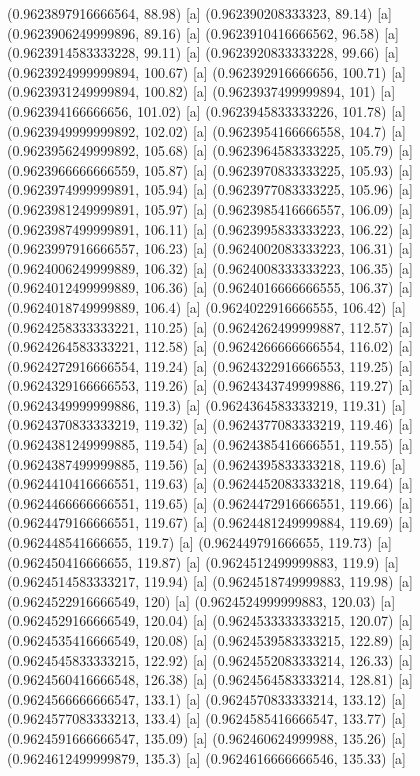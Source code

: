 {{{(0.9623897916666564, 88.98) [a] 
(0.962390208333323, 89.14) [a] 
(0.9623906249999896, 89.16) [a] 
(0.9623910416666562, 96.58) [a] 
(0.9623914583333228, 99.11) [a] 
(0.9623920833333228, 99.66) [a] 
(0.9623924999999894, 100.67) [a] 
(0.962392916666656, 100.71) [a] 
(0.9623931249999894, 100.82) [a] 
(0.9623937499999894, 101) [a] 
(0.962394166666656, 101.02) [a] 
(0.9623945833333226, 101.78) [a] 
(0.9623949999999892, 102.02) [a] 
(0.9623954166666558, 104.7) [a] 
(0.9623956249999892, 105.68) [a] 
(0.9623964583333225, 105.79) [a] 
(0.9623966666666559, 105.87) [a] 
(0.9623970833333225, 105.93) [a] 
(0.9623974999999891, 105.94) [a] 
(0.9623977083333225, 105.96) [a] 
(0.9623981249999891, 105.97) [a] 
(0.9623985416666557, 106.09) [a] 
(0.9623987499999891, 106.11) [a] 
(0.9623995833333223, 106.22) [a] 
(0.9623997916666557, 106.23) [a] 
(0.9624002083333223, 106.31) [a] 
(0.9624006249999889, 106.32) [a] 
(0.9624008333333223, 106.35) [a] 
(0.9624012499999889, 106.36) [a] 
(0.9624016666666555, 106.37) [a] 
(0.9624018749999889, 106.4) [a] 
(0.9624022916666555, 106.42) [a] 
(0.9624258333333221, 110.25) [a] 
(0.9624262499999887, 112.57) [a] 
(0.9624264583333221, 112.58) [a] 
(0.9624266666666554, 116.02) [a] 
(0.9624272916666554, 119.24) [a] 
(0.9624322916666553, 119.25) [a] 
(0.9624329166666553, 119.26) [a] 
(0.9624343749999886, 119.27) [a] 
(0.9624349999999886, 119.3) [a] 
(0.9624364583333219, 119.31) [a] 
(0.9624370833333219, 119.32) [a] 
(0.9624377083333219, 119.46) [a] 
(0.9624381249999885, 119.54) [a] 
(0.9624385416666551, 119.55) [a] 
(0.9624387499999885, 119.56) [a] 
(0.9624395833333218, 119.6) [a] 
(0.9624410416666551, 119.63) [a] 
(0.9624452083333218, 119.64) [a] 
(0.9624466666666551, 119.65) [a] 
(0.9624472916666551, 119.66) [a] 
(0.9624479166666551, 119.67) [a] 
(0.9624481249999884, 119.69) [a] 
(0.962448541666655, 119.7) [a] 
(0.962449791666655, 119.73) [a] 
(0.962450416666655, 119.87) [a] 
(0.9624512499999883, 119.9) [a] 
(0.9624514583333217, 119.94) [a] 
(0.9624518749999883, 119.98) [a] 
(0.9624522916666549, 120) [a] 
(0.9624524999999883, 120.03) [a] 
(0.9624529166666549, 120.04) [a] 
(0.9624533333333215, 120.07) [a] 
(0.9624535416666549, 120.08) [a] 
(0.9624539583333215, 122.89) [a] 
(0.9624545833333215, 122.92) [a] 
(0.9624552083333214, 126.33) [a] 
(0.9624560416666548, 126.38) [a] 
(0.9624564583333214, 128.81) [a] 
(0.9624566666666547, 133.1) [a] 
(0.9624570833333214, 133.12) [a] 
(0.9624577083333213, 133.4) [a] 
(0.9624585416666547, 133.77) [a] 
(0.9624591666666547, 135.09) [a] 
(0.962460624999988, 135.26) [a] 
(0.9624612499999879, 135.3) [a] 
(0.9624616666666546, 135.33) [a] 
}}}
